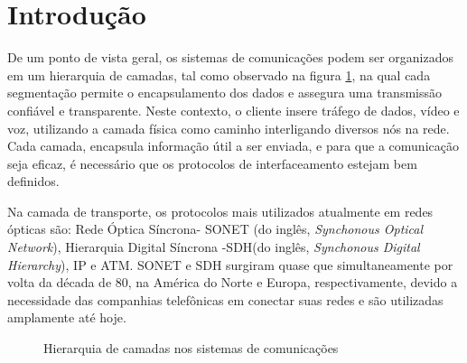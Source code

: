 \documentclass[a4paper,12pt]{article}
\begin{document}
\section{Introdução}

De um ponto de vista geral, os sistemas de comunicações podem ser organizados em um hierarquia de camadas, tal como observado na figura \ref{fig1}, na qual cada segmentação permite o encapsulamento dos dados e assegura uma transmissão confiável e transparente. Neste contexto, o cliente insere tráfego de dados, vídeo e voz, utilizando a camada física como caminho interligando diversos nós na rede. Cada camada, encapsula informação útil a ser enviada, e para que a comunicação seja eficaz, é necessário que os protocolos de interfaceamento estejam bem definidos.

Na camada de transporte, os protocolos mais utilizados atualmente em redes ópticas são: Rede Óptica Síncrona- SONET (do inglês, {\it Synchonous Optical Network}), Hierarquia Digital Síncrona -SDH(do inglês, {\it Synchonous Digital Hierarchy}), IP e ATM. SONET e SDH surgiram quase que simultaneamente por volta da década de 80, na América do Norte e Europa, respectivamente, devido a necessidade das companhias telefônicas em conectar suas redes e são utilizadas amplamente até hoje.

\begin{figure}[!htb]


\begin{center}

\caption{Hierarquia de camadas nos sistemas de comunicações \label{fig1}}
\end{center}
\end{figure}
\end{document}
